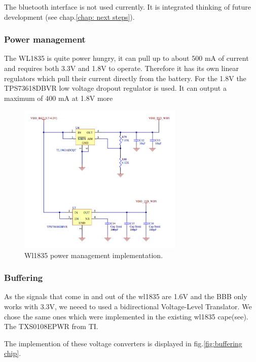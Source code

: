 The bluetooth interface is not used currently. It is integrated thinking of future development (see chap.\ref{chap: next steps}).

\subsubsection{Power management}
The WL1835 is quite power hungry, it can pull up to about 500 mA of current and requires both 3.3V and 1.8V to operate. Therefore it has its own linear regulators which pull their current directly from the battery. For the 1.8V the TPS73618DBVR low voltage dropout regulator is used. It can output a maximum of 400 mA at 1.8V more

\begin{figure}[!ht]
    \centering
    \includegraphics[width=0.7\textwidth,keepaspectratio]{chap/hardFig/wl1835_power_sch}
    \caption{Wl1835 power management implementation.}
    \label{fig:power management}
\end{figure}

\subsubsection{Buffering}
As the signals that come in and out of the wl1835 are 1.6V and the BBB only works with 3.3V, we neeed to used a bidirectional Voltage-Level Translator. We chose the same ones which were implemented in the existing wl1835 cape(see). The TXS0108EPWR from TI.

The implemention of these voltage converters is displayed in fig.\ref{fig:buffering chip}.

